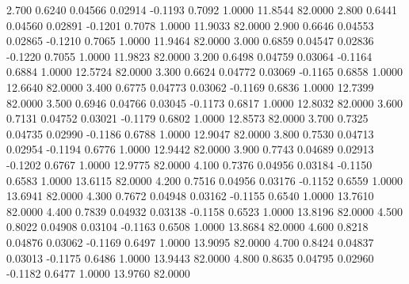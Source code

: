   2.700   0.6240   0.04566   0.02914  -0.1193   0.7092   1.0000  11.8544  82.0000
   2.800   0.6441   0.04560   0.02891  -0.1201   0.7078   1.0000  11.9033  82.0000
   2.900   0.6646   0.04553   0.02865  -0.1210   0.7065   1.0000  11.9464  82.0000
   3.000   0.6859   0.04547   0.02836  -0.1220   0.7055   1.0000  11.9823  82.0000
   3.200   0.6498   0.04759   0.03064  -0.1164   0.6884   1.0000  12.5724  82.0000
   3.300   0.6624   0.04772   0.03069  -0.1165   0.6858   1.0000  12.6640  82.0000
   3.400   0.6775   0.04773   0.03062  -0.1169   0.6836   1.0000  12.7399  82.0000
   3.500   0.6946   0.04766   0.03045  -0.1173   0.6817   1.0000  12.8032  82.0000
   3.600   0.7131   0.04752   0.03021  -0.1179   0.6802   1.0000  12.8573  82.0000
   3.700   0.7325   0.04735   0.02990  -0.1186   0.6788   1.0000  12.9047  82.0000
   3.800   0.7530   0.04713   0.02954  -0.1194   0.6776   1.0000  12.9442  82.0000
   3.900   0.7743   0.04689   0.02913  -0.1202   0.6767   1.0000  12.9775  82.0000
   4.100   0.7376   0.04956   0.03184  -0.1150   0.6583   1.0000  13.6115  82.0000
   4.200   0.7516   0.04956   0.03176  -0.1152   0.6559   1.0000  13.6941  82.0000
   4.300   0.7672   0.04948   0.03162  -0.1155   0.6540   1.0000  13.7610  82.0000
   4.400   0.7839   0.04932   0.03138  -0.1158   0.6523   1.0000  13.8196  82.0000
   4.500   0.8022   0.04908   0.03104  -0.1163   0.6508   1.0000  13.8684  82.0000
   4.600   0.8218   0.04876   0.03062  -0.1169   0.6497   1.0000  13.9095  82.0000
   4.700   0.8424   0.04837   0.03013  -0.1175   0.6486   1.0000  13.9443  82.0000
   4.800   0.8635   0.04795   0.02960  -0.1182   0.6477   1.0000  13.9760  82.0000
